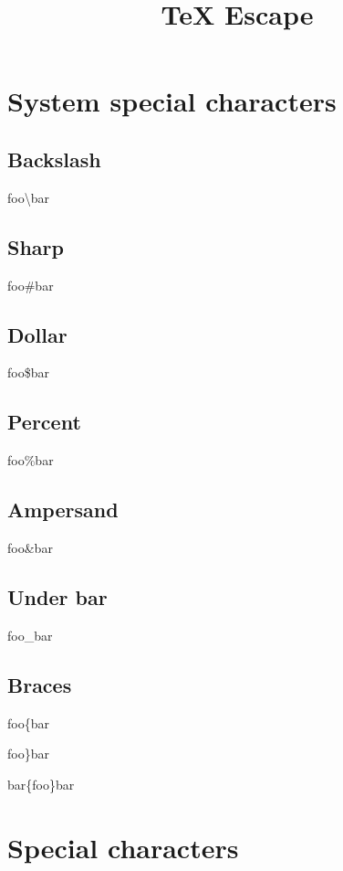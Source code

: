 \documentclass[a4paper,11pt,oneside,openany,report]{jsbook}
\title{TeX Escape}
\begin{document}
\maketitle
\chapter{System special characters}\label{ch:Systemspecialcharacters}
\section{Backslash}\label{sec:Systemspecialcharacters/Backslash}
foo{\textbackslash}bar

\section{Sharp}\label{sec:Systemspecialcharacters/Sharp}
foo{\#}bar

\section{Dollar}\label{sec:Systemspecialcharacters/Dollar}
foo{\$}bar

\section{Percent}\label{sec:Systemspecialcharacters/Percent}
foo{\%}bar

\section{Ampersand}\label{sec:Systemspecialcharacters/Ampersand}
foo{\&}bar

\section{Under bar}\label{sec:Systemspecialcharacters/Underbar}
foo{\_}bar

\section{Braces}\label{sec:Systemspecialcharacters/Braces}
foo\{bar

foo\}bar

bar\{foo\}bar

\chapter{Special characters}\label{ch:Specialcharacters}
\end{document}
